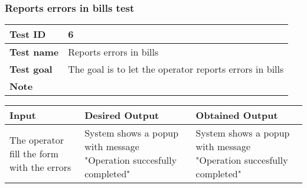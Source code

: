 {{		\subsubsection{Reports errors in bills test}{
			\begin{table}[h]
			\begin{tabular}{|p{4cm}|p{10cm}|}
			\hline
				\centering \vspace{1mm} \bfseries{Test ID} \vspace{1mm} & 
				\vspace{1mm} 6 \vspace{1mm}\\
			\hline
				\centering \vspace{1mm} \bfseries{Test name} \vspace{1mm} & 
				\vspace{1mm} Reports errors in bills\vspace{1mm}\\
			\hline
				\centering \vspace{1mm} \bfseries{Test goal} \vspace{1mm} & 
				\vspace{1mm} The goal is to let the operator reports errors in bills\vspace{1mm}\\
			\hline
				\centering \vspace{1mm} \bfseries{Note} \vspace{1mm} & 
				\vspace{1mm}  \vspace{1mm}\\
			\hline
			\end{tabular}
			\end{table}

			\begin{table}[h]
			\begin{tabular}{|p{4cm}|p{5cm}|p{5cm}|}
			\hline
			\centering \vspace{1mm} \bfseries{Input} \vspace{1mm} & \vspace{1mm} \bfseries{Desired Output} \vspace{1mm} & \vspace{1mm} \bfseries{Obtained Output} \vspace{1mm}\\
			\hline
				\vspace{1mm} The operator fill the form with the errors \vspace{1mm} &
				\vspace{1mm} System shows a popup with message "Operation succesfully completed" \vspace{1mm} & 
				\vspace{1mm} System shows a popup with message "Operation succesfully completed" \vspace{1mm} \\
			\hline
			\end{tabular}
			\end{table}
		}
		\clearpage

}}
